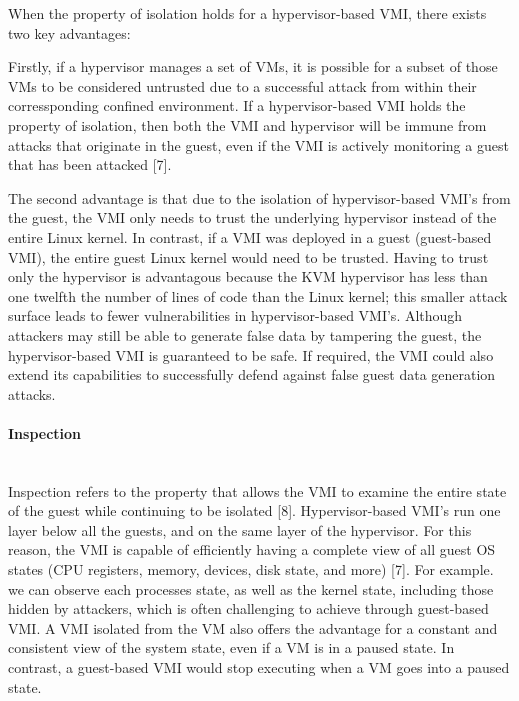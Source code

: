 \documentclass{report}
\begin{document}
\begin{spacing}{1.5}
{\large
When the property of isolation holds for a hypervisor-based VMI, there exists two key advantages:
\newline\newline
}

{\large
Firstly, if a hypervisor manages a set of VMs, it is possible for a subset of those VMs to be considered untrusted due to a successful attack from within their corressponding confined environment. If a hypervisor-based VMI holds the property of isolation, then both the VMI and hypervisor will be immune from attacks that originate in the guest, even if the VMI is actively monitoring a guest that has been attacked [7].
\newline
}

{\large
The second advantage is that due to the isolation of hypervisor-based VMI's from the guest, the VMI only needs to trust the underlying hypervisor instead of the entire Linux kernel. In contrast, if a VMI was deployed in a guest (guest-based VMI), the entire guest Linux kernel would need to be trusted. Having to trust only the hypervisor is advantagous because the KVM hypervisor has less than one twelfth the number of lines of code than the Linux kernel; this smaller attack surface leads to fewer vulnerabilities in hypervisor-based VMI's. Although attackers may still be able to generate false data by tampering the guest, the hypervisor-based VMI is guaranteed to be safe. If required, the VMI could also extend its capabilities to successfully defend against false guest data generation attacks.
\newline
}


\paragraph{Inspection}\mbox{}\\


{\large
Inspection refers to the property that allows the VMI to examine the entire state of the guest while continuing to be isolated [8]. Hypervisor-based VMI's run one layer below all the guests, and on the same layer of the hypervisor. For this reason, the VMI is capable of efficiently having a complete view of all guest OS states (CPU registers, memory, devices, disk state, and more) [7]. For example. we can observe each processes state, as well as the kernel state, including those hidden by attackers, which is often challenging to achieve through guest-based VMI. A VMI isolated from the VM also offers the advantage for a constant and consistent view of the system state, even if a VM is in a paused state. In contrast, a guest-based VMI would stop executing when a VM goes into a paused state. 
\newline
}




\end{spacing}
\end{document}
